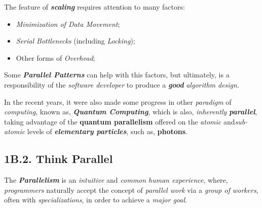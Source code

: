 \vspace{0.35cm}

\noindent The feature of \textbf{\emph{scaling}} requires attention to many factors:
\begin{itemize}
    \vspace{-0.2cm}
    \item \emph{Minimization of Data Movement};
    \vspace{-0.2cm}
    \item \emph{Serial Bottlenecks} (including \emph{Locking});
    \vspace{-0.2cm}
    \item Other forms of \emph{Overhead};
\end{itemize}

\noindent Some \textbf{\emph{Parallel Patterns}} can help with this factors, but ultimately, is a responsibility of the \emph{software developer} to produce a \textbf{\emph{good}} \emph{algorithm design}.

In the recent years, it were also made some progress in other \emph{paradigm} of \emph{computing}, known as, \textbf{\emph{Quantum Computing}}, which is also, \emph{inherently} \textbf{\emph{parallel}}, taking advantage of the \textbf{quantum parallelism} offered on the \emph{atomic} and\emph{sub-atomic} levels of \textbf{\emph{elementary particles}}, such as, \textbf{photons}.

\newpage

\subsection*{\large{\textbf{1B.2. Think Parallel}}}
\label{ssec:lecture-1B2}

\noindent The \textbf{\emph{Parallelism}} is an \emph{intuitive} and \emph{common} \emph{human experience}, where, \emph{programmers} naturally accept the concept of \emph{parallel work} via a \emph{group of workers}, often with \emph{specializations}, in order to achieve a \emph{major goal}.

\vspace{0.35cm}

